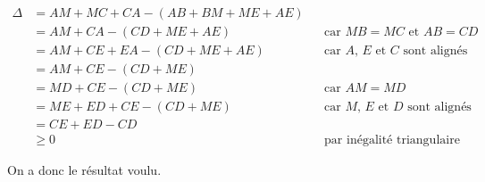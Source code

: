 \begin{align*}
\Delta & = AM+MC+CA -(AB+BM+ME+AE) \\
& = AM+CA - (CD+ME+AE) && \text{car $MB=MC$ et $AB=CD$} \\
& = AM+CE+EA - (CD+ME+AE) && \text{car $A$, $E$ et $C$ sont alignés} \\
& = AM+CE - (CD+ME) \\
& = MD+CE - (CD+ME) && \text{car $AM=MD$} \\
& = ME+ED+CE - (CD+ME) && \text{car $M$, $E$ et $D$ sont alignés} \\
& = CE+ED - CD \\
& \ge 0 && \text{par inégalité triangulaire}
\end{align*}

On a donc le résultat voulu.